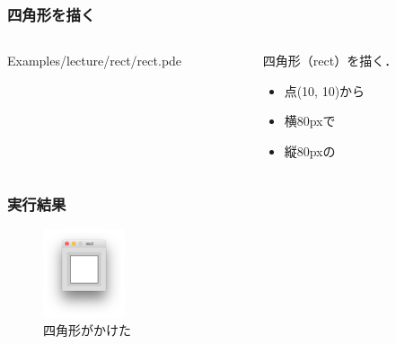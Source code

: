 \documentclass[dvipdfmx]{beamer}
\begin{document}
        \begin{frame}
            \frametitle{四角形を描く}
            \begin{columns}[c]
                \begin{column}{0.50\textwidth}
                    \tiny
                    Examples/lecture/rect/rect.pde
                    \scriptsize
                \end{column}
                \begin{column}{0.50\textwidth}
                    \begin{block}{四角形（rect）を描く．}
                        \begin{itemize}
                            \item 点(10, 10)から
                            \item 横80pxで
                            \item 縦80pxの
                        \end{itemize}
                    \end{block}
                \end{column}
            \end{columns}
        \end{frame}

        \begin{frame}
            \frametitle{実行結果}
                \begin{figure}[htb]
                    \includegraphics[width=24mm]{images/06.png}
                    \caption{四角形がかけた}
                    \label{fig:06}
                \end{figure}
        \end{frame}
\end{document}

